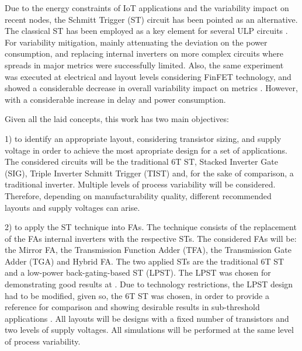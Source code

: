 \documentclass[pgmicro,mestrado,english]{iiufrgs}
\begin{document}
    Due to the energy constraints of IoT applications and the variability impact on recent nodes, the Schmitt Trigger (ST) circuit has been pointed as an alternative. The classical ST has been employed as a key element for several ULP circuits \cite{kulkarni2007160, hays201262, melek:17, lotze2017ultra}. For variability mitigation, mainly attenuating the deviation on the power consumption, and replacing internal inverters on more complex circuits \cite{dokania2015circuit} where spreads in major metrics were successfully limited. Also, the same experiment was executed at electrical and layout levels considering FinFET technology, and showed a considerable decrease in overall variability impact on metrics \cite{toledo2018pros,moraes2018evaluation}. However, with a considerable increase in delay and power consumption.


	Given all the laid concepts, this work has two main objectives: 
	
	1) to identify an appropriate layout, considering transistor sizing, and supply voltage in order to achieve the most apropriate design for a set of applications. The considered circuits will be the traditional 6T ST, Stacked Inverter Gate (SIG), Triple Inverter Schmitt Trigger (TIST) and, for the sake of comparison, a traditional inverter. Multiple levels of process variability will be considered. Therefore, depending on manufacturability quality, different recommended layouts and supply voltages can arise.

	2) to apply the ST technique into FAs. The technique consists of the replacement of the FAs internal inverters with the respective STs. The considered FAs will be: the Mirror FA, the Transmission Function Adder (TFA), the Transmission Gate Adder (TGA) and Hybrid FA. The two applied STs are the traditional 6T ST and a low-power back-gating-based ST (LPST). The LPST was chosen for demonstrating good results at \cite{dokania2015circuit}. Due to technology restrictions, the LPST design had to be modified, given so, the 6T ST was chosen, in order to provide a reference for comparison and showing desirable results in sub-threshold applications \cite{lotze2017ultra}. All layouts will be designs with a fixed number of transistors and two levels of supply voltages. All simulations will be performed at the same level of process variability.
\end{document}
